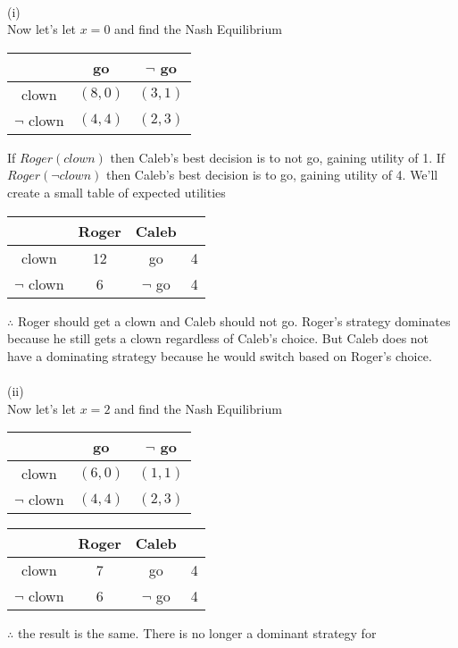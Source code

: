 \documentclass[12pt,letter]{article}
\begin{document}
\\
(i)\\
Now let's let $x=0$ and find the Nash Equilibrium
\begin{figure*}[h]
\centering
\begin{tabular}{|c|c|c|}
	\hline
	& go & $\neg$ go\\
	\hline
	clown & $(8,0)$ & $(3,1)$\\
	\hline
	$\neg$ clown & $(4,4)$ & $(2,3)$\\
	\hline
\end{tabular}
\end{figure*}
If $Roger(clown)$ then Caleb's best decision is to not go, gaining utility of 1.
If $Roger(\neg clown)$ then Caleb's best decision is to go, gaining utility of 4.
We'll create a small table of expected utilities
\begin{figure*}[h!]
\centering
\begin{tabular}{c c|c c}
	& Roger & Caleb\\
	\hline
	clown & 12 & go & 4\\
	$\neg$ clown & 6 & $\neg$ go & 4
\end{tabular}
\end{figure*}
\FloatBarrier
$\therefore$ Roger should get a clown and Caleb should not go. Roger's strategy
dominates because he still gets a clown regardless of Caleb's choice. But Caleb
does not have a dominating strategy because he would switch based on Roger's 
choice.
\\
\\
(ii)\\
Now let's let $x=2$ and find the Nash Equilibrium
\begin{figure*}[h!]
\centering
\begin{tabular}{|c|c|c|}
	\hline
	& go & $\neg$ go\\
	\hline
	clown & $(6,0)$ & $(1,1)$\\
	\hline
	$\neg$ clown & $(4,4)$ & $(2,3)$\\
	\hline
\end{tabular}
\end{figure*}
\begin{figure*}[h!]
\centering
\begin{tabular}{c c|c c}
	& Roger & Caleb\\
	\hline
	clown & 7 & go & 4\\
	$\neg$ clown & 6 & $\neg$ go & 4
\end{tabular}
\end{figure*}
\FloatBarrier
$\therefore$ the result is the same. There is no longer a dominant strategy for
\end{document}
